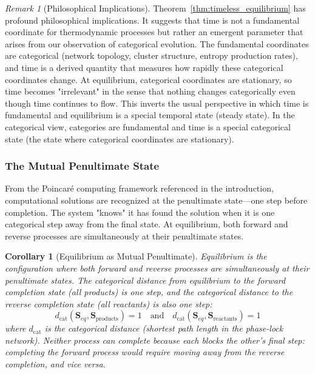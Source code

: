 \documentclass[12pt,a4paper]{article}
\newtheorem{corollary}[theorem]{Corollary}
\theoremstyle{definition}
\theoremstyle{remark}
\newtheorem{remark}[theorem]{Remark}
\begin{document}
\begin{remark}[Philosophical Implications]
\label{rem:time_philosophy}
Theorem~\ref{thm:timeless_equilibrium} has profound philosophical implications. It suggests that time is not a fundamental coordinate for thermodynamic processes but rather an emergent parameter that arises from our observation of categorical evolution. The fundamental coordinates are categorical (network topology, cluster structure, entropy production rates), and time is a derived quantity that measures how rapidly these categorical coordinates change. At equilibrium, categorical coordinates are stationary, so time becomes "irrelevant" in the sense that nothing changes categorically even though time continues to flow. This inverts the usual perspective in which time is fundamental and equilibrium is a special temporal state (steady state). In the categorical view, categories are fundamental and time is a special categorical state (the state where categorical coordinates are stationary).
\end{remark}

\subsubsection{The Mutual Penultimate State}

From the Poincaré computing framework referenced in the introduction, computational solutions are recognized at the penultimate state—one step before completion. The system "knows" it has found the solution when it is one categorical step away from the final state. At equilibrium, both forward and reverse processes are simultaneously at their penultimate states.

\begin{corollary}[Equilibrium as Mutual Penultimate]
\label{cor:mutual_penultimate}
Equilibrium is the configuration where both forward and reverse processes are simultaneously at their penultimate states. The categorical distance from equilibrium to the forward completion state (all products) is one step, and the categorical distance to the reverse completion state (all reactants) is also one step:
\begin{equation}
d_{\text{cat}}(\mathbf{S}_{eq}, \mathbf{S}_{\text{products}}) = 1 \quad \text{and} \quad d_{\text{cat}}(\mathbf{S}_{eq}, \mathbf{S}_{\text{reactants}}) = 1
\label{eq:mutual_penultimate}
\end{equation}
where $d_{\text{cat}}$ is the categorical distance (shortest path length in the phase-lock network). Neither process can complete because each blocks the other's final step: completing the forward process would require moving away from the reverse completion, and vice versa.
\end{corollary}
\end{document}
